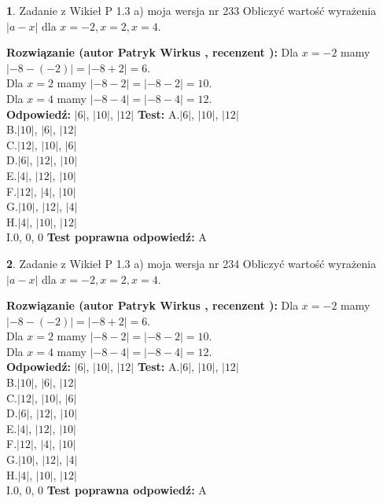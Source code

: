 \documentclass[12pt, a4paper]{article}
\theoremstyle{definition} %
\newtheorem{zad}{}
\newcommand{\zadStart}[1]{\begin{zad}#1\newline}
\newcommand{\zadStop}{\end{zad}}
\newcommand{\rozwStart}[2]{\noindent \textbf{Rozwiązanie (autor #1 , recenzent #2): }\newline}
\newcommand{\rozwStop}{\newline}
\newcommand{\odpStart}{\noindent \textbf{Odpowiedź:}\newline}
\newcommand{\odpStop}{\newline}
\newcommand{\testStart}{\noindent \textbf{Test:}\newline}
\newcommand{\testStop}{\newline}
\newcommand{\kluczStart}{\noindent \textbf{Test poprawna odpowiedź:}\newline}
\newcommand{\kluczStop}{\newline}
\begin{document}
\zadStart{Zadanie z Wikieł P 1.3 a) moja wersja nr 233}
Obliczyć wartość wyrażenia $|a - x|$ dla $x=-2,x=2,x=4$.
\zadStop
\rozwStart{Patryk Wirkus}{}
Dla $x = -2$ mamy $|-8 - (-2)| = |-8 + 2| = 6$.\\
Dla $x = 2$ mamy $|-8 - 2| = |-8 - 2| = 10$.\\
Dla $x = 4$ mamy $|-8 - 4| = |-8 - 4| = 12$.\\
\rozwStop
\odpStart
$|6|$, $|10|$, $|12|$
\odpStop
\testStart
A.$|6|$, $|10|$, $|12|$\\
B.$|10|$, $|6|$, $|12|$\\
C.$|12|$, $|10|$, $|6|$\\
D.$|6|$, $|12|$, $|10|$\\
E.$|4|$, $|12|$, $|10|$\\
F.$|12|$, $|4|$, $|10|$\\
G.$|10|$, $|12|$, $|4|$\\
H.$|4|$, $|10|$, $|12|$\\
I.$0$, $0$, $0$
\testStop
\kluczStart
A
\kluczStop



\zadStart{Zadanie z Wikieł P 1.3 a) moja wersja nr 234}
Obliczyć wartość wyrażenia $|a - x|$ dla $x=-2,x=2,x=4$.
\zadStop
\rozwStart{Patryk Wirkus}{}
Dla $x = -2$ mamy $|-8 - (-2)| = |-8 + 2| = 6$.\\
Dla $x = 2$ mamy $|-8 - 2| = |-8 - 2| = 10$.\\
Dla $x = 4$ mamy $|-8 - 4| = |-8 - 4| = 12$.\\
\rozwStop
\odpStart
$|6|$, $|10|$, $|12|$
\odpStop
\testStart
A.$|6|$, $|10|$, $|12|$\\
B.$|10|$, $|6|$, $|12|$\\
C.$|12|$, $|10|$, $|6|$\\
D.$|6|$, $|12|$, $|10|$\\
E.$|4|$, $|12|$, $|10|$\\
F.$|12|$, $|4|$, $|10|$\\
G.$|10|$, $|12|$, $|4|$\\
H.$|4|$, $|10|$, $|12|$\\
I.$0$, $0$, $0$
\testStop
\kluczStart
A
\kluczStop
\end{document}
